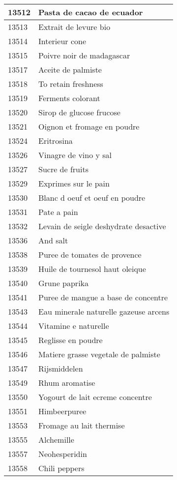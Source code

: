 \begin{longtable}{|l|l|}
13512 & Pasta de cacao de ecuador \\ \hline 
13513 & Extrait de levure bio \\ \hline 
13514 & Interieur cone \\ \hline 
13515 & Poivre noir de madagascar \\ \hline 
13517 & Aceite de palmiste \\ \hline 
13518 & To retain freshness \\ \hline 
13519 & Ferments colorant \\ \hline 
13520 & Sirop de glucose frucose \\ \hline 
13521 & Oignon et fromage en poudre \\ \hline 
13524 & Eritrosina \\ \hline 
13526 & Vinagre de vino y sal \\ \hline 
13527 & Sucre de fruits \\ \hline 
13529 & Exprimes sur le pain \\ \hline 
13530 & Blanc d oeuf et oeuf en poudre \\ \hline 
13531 & Pate a pain \\ \hline 
13532 & Levain de seigle deshydrate desactive \\ \hline 
13536 & And salt \\ \hline 
13538 & Puree de tomates de provence \\ \hline 
13539 & Huile de tournesol haut oleique \\ \hline 
13540 & Grune paprika \\ \hline 
13541 & Puree de mangue a base de concentre \\ \hline 
13543 & Eau minerale naturelle gazeuse arcens \\ \hline 
13544 & Vitamine e naturelle \\ \hline 
13545 & Reglisse en poudre \\ \hline 
13546 & Matiere grasse vegetale de palmiste \\ \hline 
13547 & Rijsmiddelen \\ \hline 
13549 & Rhum aromatise \\ \hline 
13550 & Yogourt de lait ecreme concentre \\ \hline 
13551 & Himbeerpuree \\ \hline 
13553 & Fromage au lait thermise \\ \hline 
13555 & Alchemille \\ \hline 
13557 & Neohesperidin \\ \hline 
13558 & Chili peppers \\ \hline 

\end{longtable}
